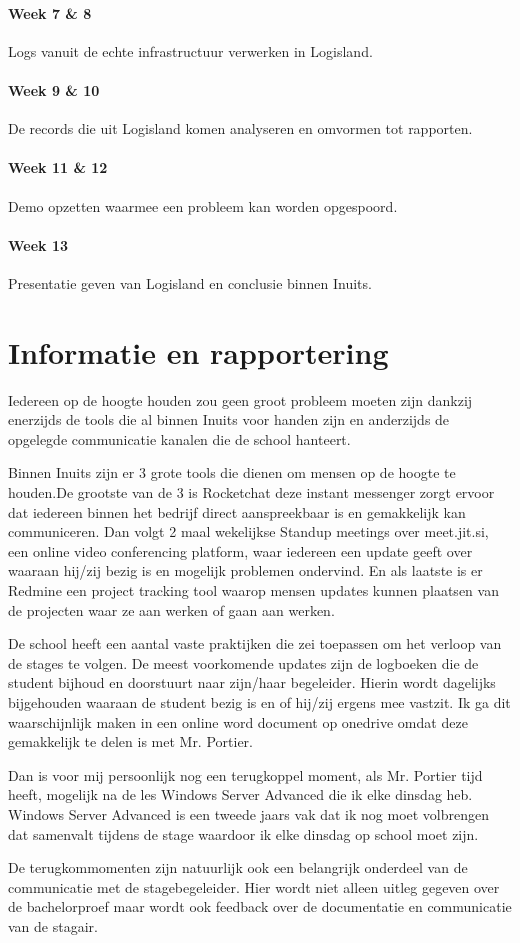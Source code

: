 \documentclass[a4paper]{article}
\begin{document}
\paragraph{Week 7 \& 8} Logs vanuit de echte infrastructuur verwerken in Logisland.
\paragraph{Week 9 \& 10} De records die uit Logisland komen analyseren en omvormen tot rapporten.
\paragraph{Week 11 \& 12} Demo opzetten waarmee een probleem kan worden opgespoord.
\paragraph{Week 13} Presentatie geven van Logisland en conclusie binnen Inuits.

\newpage{}
\section{Informatie en rapportering}
Iedereen op de hoogte houden zou geen groot probleem moeten zijn dankzij enerzijds de tools die al binnen Inuits voor handen zijn en anderzijds de opgelegde communicatie kanalen die de school hanteert.
\par
Binnen Inuits zijn er 3 grote tools die dienen om mensen op de hoogte te houden.De grootste van de 3 is Rocketchat deze instant messenger zorgt ervoor dat iedereen binnen het bedrijf direct aanspreekbaar is en gemakkelijk kan communiceren.
Dan volgt 2 maal wekelijkse Standup meetings over meet.jit.si, een online video conferencing platform, waar iedereen een update geeft over waaraan hij/zij bezig is en mogelijk problemen ondervind.
En als laatste is er Redmine een project tracking tool waarop mensen updates kunnen plaatsen van de projecten waar ze aan werken of gaan aan werken.
\par
De school heeft een aantal vaste praktijken die zei toepassen om het verloop van de stages te volgen.
De meest voorkomende updates zijn de logboeken die de student bijhoud en doorstuurt naar zijn/haar begeleider.
Hierin wordt dagelijks bijgehouden waaraan de student bezig is en of hij/zij ergens mee vastzit. Ik ga dit waarschijnlijk maken in een online word document op onedrive omdat deze gemakkelijk te delen is met Mr. Portier.
\par
Dan is voor mij persoonlijk nog een terugkoppel moment, als Mr. Portier tijd heeft, mogelijk na de les Windows Server Advanced die ik elke dinsdag heb. 
Windows Server Advanced is een tweede jaars vak dat ik nog moet volbrengen dat samenvalt tijdens de stage waardoor ik elke dinsdag op school moet zijn.
\par
De terugkommomenten zijn natuurlijk ook een belangrijk onderdeel van de communicatie met de stagebegeleider. Hier wordt niet alleen uitleg gegeven over de bachelorproef maar wordt ook feedback over de documentatie en communicatie van de stagair.
\end{document}
